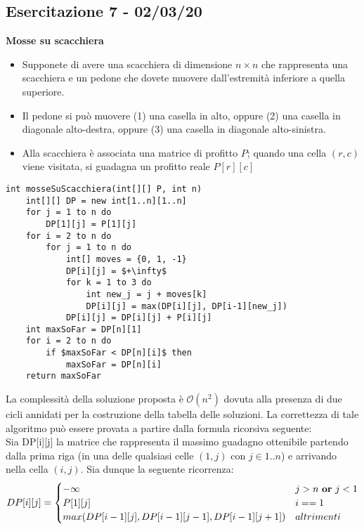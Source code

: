 \documentclass[../cheatSheetAlgoritmi.tex]{subfiles}
\begin{document}
\subsection{Esercitazione 7 - 02/03/20}
\textbf{Mosse su scacchiera}
\begin{itemize}
	\item Supponete di avere una scacchiera di dimensione $n \times n$ che rappresenta una scacchiera e un pedone che dovete muovere dall'estremità inferiore a quella superiore.
	\item Il pedone si può muovere (1) una casella in alto, oppure (2) una casella in diagonale alto-destra, oppure (3) una casella in diagonale alto-sinistra.
	\item Alla scacchiera è associata una matrice di profitto $P$; quando una cella $(r, c)$ viene visitata, si guadagna un profitto reale $P[r][c]$
\end{itemize}
\begin{lstlisting}[caption=Mosse su scacchiera]
int mosseSuScacchiera(int[][] P, int n)
    int[][] DP = new int[1..n][1..n]
    for j = 1 to n do
        DP[1][j] = P[1][j]
    for i = 2 to n do
        for j = 1 to n do
            int[] moves = {0, 1, -1}
            DP[i][j] = $+\infty$
            for k = 1 to 3 do
                int new_j = j + moves[k]
                DP[i][j] = max(DP[i][j], DP[i-1][new_j])
            DP[i][j] = DP[i][j] + P[i][j]
    int maxSoFar = DP[n][1]
    for i = 2 to n do
        if $maxSoFar < DP[n][i]$ then
            maxSoFar = DP[n][i]
    return maxSoFar
\end{lstlisting}
La complessità della soluzione proposta è $\mathcal{O}(n^2)$ dovuta alla presenza di due cicli annidati per la costruzione della tabella delle soluzioni. La correttezza di tale algoritmo può essere provata a partire dalla formula ricorsiva seguente: \\
Sia DP[i][j] la matrice che rappresenta il massimo guadagno ottenibile partendo dalla prima riga (in una delle qualsiasi celle $(1, j)$ con $j \in {1..n}$) e arrivando nella cella $(i, j)$. Sia dunque la seguente ricorrenza:
\begin{equation*}
  	DP[i][j] =\begin{cases}
        -\infty & \text{$j > n$ \textbf{or} $j < 1$} \\
    	P[1][j] & \text{$i == 1$}\\
    	max(DP[i-1][j], DP[i-1][j-1], DP[i-1][j+1]) & \text{$altrimenti$}
  	\end{cases}
\end{equation*}
\end{document}
